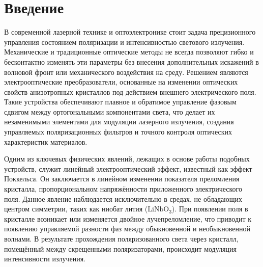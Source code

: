 \chapter{Введение} \vspace{-20pt}
\label{ch:intro}

В современной лазерной технике и оптоэлектронике стоит задача прецизионного управления состоянием поляризации и интенсивностью светового излучения. Механические и традиционные оптические методы не всегда позволяют гибко и бесконтактно изменять эти параметры без внесения дополнительных искажений в волновой фронт или механического воздействия на среду. Решением являются электрооптические преобразователи, основанные на изменении оптических свойств анизотропных кристаллов под действием внешнего электрического поля. Такие устройства обеспечивают плавное и обратимое управление фазовым сдвигом между ортогональными компонентами света, что делает их незаменимыми элементами для модуляции лазерного излучения, создания управляемых поляризационных фильтров и точного контроля оптических характеристик материалов.

Одним из ключевых физических явлений, лежащих в основе работы подобных устройств, служит линейный электрооптический эффект, известный как эффект Поккельса. Он заключается в линейном изменении показателя преломления кристалла, пропорциональном напряжённости приложенного электрического поля. Данное явление наблюдается исключительно в средах, не обладающих центром симметрии, таких как ниобат лития ($\text{LiNbO}_3$). При появлении поля в кристалле возникает или изменяется двойное лучепреломление, что приводит к появлению управляемой разности фаз между обыкновенной и необыкновенной волнами. В результате прохождения поляризованного света через кристалл, помещённый между скрещенными поляризаторами, происходит модуляция интенсивности излучения. 

